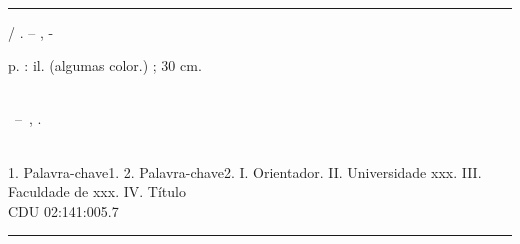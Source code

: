 \documentclass[
	12pt,				%
	oneside,			%
	a4paper,			%
	english,			%
	brazil				%
	]{abntex2}
\newcommand{\includepaper}[1]{}
\renewcommand{\ABNTEXchapterfont}{\rmfamily\bfseries}
\renewcommand{\imprimircapa}{%
  \begin{capa}%
    \center
    \bfseries\imprimirinstituicao

    \vfill
    \ABNTEXchapterfont\bfseries\LARGE\imprimirtitulo

    \vfill
    \ABNTEXchapterfont\large\imprimirautor

    \vfill
    \large\imprimirlocal\\
    \large\imprimirdata

    \vspace*{1cm}
  \end{capa}
}
\begin{document}
\frenchspacing


\imprimircapa

\imprimirfolhaderosto*


%
\begin{fichacatalografica}
	\vspace*{\fill}					%
	\hrule							%
	\begin{center}					%
	\begin{minipage}[c]{12.5cm}		%

	\imprimirautor

	\hspace{0.5cm} \imprimirtitulo  / \imprimirautor. --
	\imprimirlocal, \imprimirdata-

	\hspace{0.5cm} \pageref{LastPage} p. : il. (algumas color.) ; 30 cm.\\

	\hspace{0.5cm} \imprimirorientadorRotulo~\imprimirorientador\\

	\hspace{0.5cm}
	\parbox[t]{\textwidth}{\imprimirtipotrabalho~--~\imprimirinstituicao,
	\imprimirdata.}\\

	\hspace{0.5cm}
		1. Palavra-chave1.
		2. Palavra-chave2.
		I. Orientador.
		II. Universidade xxx.
		III. Faculdade de xxx.
		IV. Título\\

	\hspace{8.75cm} CDU 02:141:005.7\\

	\end{minipage}
	\end{center}
	\hrule
\end{fichacatalografica}
\end{document}
